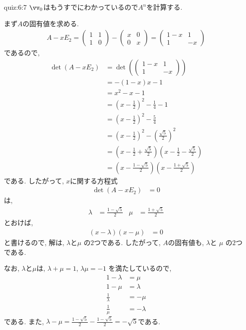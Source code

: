 \begin{answerof}{quiz:6:7}
$\vv_0$はもうすでにわかっているので$A^n$を計算する.

まず$A$の固有値を求める.
\begin{align*}
  A-xE_2=\begin{pmatrix}1&1\\1&0\end{pmatrix}-\begin{pmatrix}x&0\\0&x\end{pmatrix}
=\begin{pmatrix}1-x&1\\1&-x\end{pmatrix}
\end{align*}
であるので,
\begin{align*}
  \det(A-xE_2)&=\det(\begin{pmatrix}1-x&1\\1&-x\end{pmatrix})\\
    &=-(1-x)x-1\\
    &=x^2-x-1\\
    &=\left(x-\frac{1}{2}\right)^2-\frac{1}{4}-1\\
    &=\left(x-\frac{1}{2}\right)^2-\frac{5}{4}\\\
    &=\left(x-\frac{1}{2}\right)^2-\left(\frac{\sqrt{5}}{2}\right)^2\\
    &=\left(x-\frac{1}{2}+\frac{\sqrt{5}}{2}\right)\left(x-\frac{1}{2}-\frac{\sqrt{5}}{2}\right)\\
    &=\left(x-\frac{1-\sqrt{5}}{2}\right)\left(x-\frac{1+\sqrt{5}}{2}\right)
\end{align*}
である.
したがって, $x$に関する方程式
\begin{align*}
  \det(A-xE_2)&=0
\end{align*}
は,
\begin{align*}
\lambda&=\frac{1-\sqrt{5}}{2}&
\mu&=\frac{1+\sqrt{5}}{2}
\end{align*}
とおけば,
\begin{align*}
  \left(x-\lambda\right)\left(x-\mu\right)&=0
\end{align*}
と書けるので,
解は, $\lambda$と$\mu$
の$2$つである.
したがって,
$A$の固有値も,
$\lambda$と
$\mu$
の$2$つである.


なお,
$\lambda$と$\mu$は,
$\lambda+\mu=1$,
$\lambda\mu=-1$
を満たしているので,
\begin{align*}
  1-\lambda&=\mu\\
  1-\mu&=\lambda\\
\frac{1}{\lambda}&=-\mu\\
\frac{1}{\mu}&=-\lambda
\end{align*}
である.
また,
$\lambda-\mu=\frac{1-\sqrt{5}}{2}-\frac{1-\sqrt{5}}{2}=-\sqrt{5}$である.




\end{answerof}
